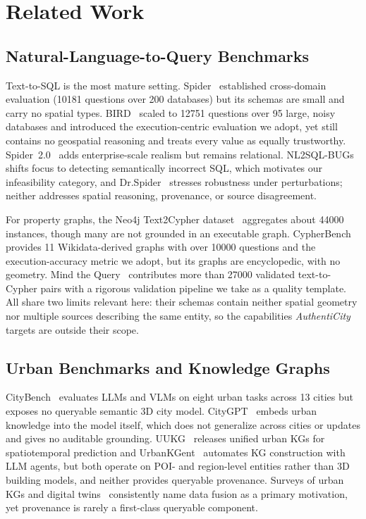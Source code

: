 \documentclass[sigconf,authordraft]{acmart}
\newcommand{\benchname}{\textit{Authenti\-City}}
\begin{document}
\section{Related Work}\label{sec:related_work}

\subsection{Natural-Language-to-Query Benchmarks}

Text-to-SQL is the most mature setting. Spider~\cite{yu_spider_2018} established cross-domain evaluation (\num{10181} questions over 200 databases) but its schemas are small and carry no spatial types. BIRD~\cite{li_bird_2023} scaled to \num{12751} questions over 95 large, noisy databases and introduced the execution-centric evaluation %
we adopt, yet still contains no geospatial reasoning and treats every value as equally trustworthy. Spider~2.0~\cite{li_spider2_2025} adds enterprise-scale realism but remains relational. NL2SQL-BUGs~\cite{liu_nl2sqlbugs_2025} shifts focus to detecting semantically incorrect SQL, which motivates our infeasibility category, and Dr.Spider~\cite{chang_drspider_2023} stresses robustness under perturbations; neither addresses spatial reasoning, provenance, or source disagreement.

For property graphs, the Neo4j Text2Cypher dataset~\cite{ozsoy_text2cypher_2025} aggregates about \num{44000} instances, though many are not grounded in an executable graph. CypherBench~\cite{feng_cypherbench_2025} provides 11 Wikidata-derived graphs with over \num{10000} questions and the execution-accuracy metric we adopt, but its graphs are encyclopedic, with no geometry. Mind the Query~\cite{chauhan_mindthequery_2025} contributes more than \num{27000} validated text-to-Cypher pairs with a rigorous validation pipeline we take as a quality template. All share two limits relevant here: their schemas contain neither spatial geometry nor multiple sources describing the same entity, so the capabilities \benchname{} targets are outside their scope.

\subsection{Urban Benchmarks and Knowledge Graphs}

CityBench~\cite{feng_citybench_2025} evaluates LLMs and VLMs on eight urban tasks across 13 cities but exposes no queryable semantic 3D city model. CityGPT~\cite{feng_citygpt_2025} embeds urban knowledge into the model itself, which does not generalize across cities or updates and gives no auditable grounding. UUKG~\cite{ning_uukg_2023} releases unified urban KGs for spatiotemporal prediction and UrbanKGent~\cite{ning_urbankgent_2024} automates KG construction with LLM agents, but both operate on POI- and region-level entities rather than 3D building models, and neither provides queryable provenance. Surveys of urban KGs and digital twins~\cite{liu_urbankg_2023, wang_urbankgreview_2024, saifwajid_kgudt_2024, akroyd_kgudt_2021} consistently name data fusion as a primary motivation, yet provenance is rarely a first-class queryable component.
\end{document}
